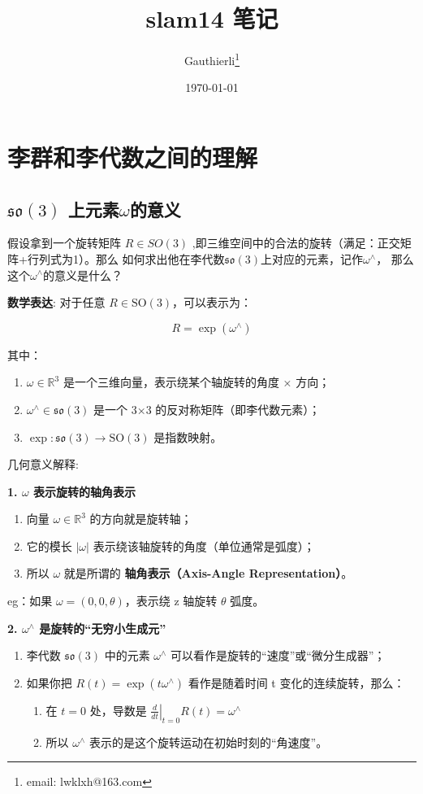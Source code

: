 \documentclass{article}
\title{\textbf{slam14 笔记}}
\author{Gauthierli\footnote{email: lwklxh@163.com}}
\date{\today}
\begin{document}
\maketitle
\newpage
\tableofcontents
\newpage

\section{李群和李代数之间的理解}
\subsection{$\mathfrak{so}(3)$ 上元素$\omega$的意义}
假设拿到一个旋转矩阵 $ R \in SO(3)$ ,即三维空间中的合法的旋转（满足：正交矩阵+行列式为1）。那么
如何求出他在李代数$\mathfrak{so}(3)$上对应的元素，记作$\omega ^{\wedge} $，
那么这个$\omega ^{\wedge} $的意义是什么？


\textbf{数学表达}:
对于任意 $ R \in \text{SO}(3) $，可以表示为：

$$
R = \exp(\omega^\wedge)
$$

其中：
\begin{enumerate}
  \item $ \omega \in \mathbb{R}^3 $ 是一个三维向量，表示绕某个轴旋转的角度 × 方向；
  \item $ \omega^\wedge \in \mathfrak{so}(3) $ 是一个 3×3 的反对称矩阵（即李代数元素）；
  \item $\exp: \mathfrak{so}(3) \to \text{SO}(3)$ 是指数映射。
\end{enumerate}


几何意义解释:

\textbf{1. $ \omega $ 表示旋转的轴角表示}
\begin{enumerate}
  \item 向量 $ \omega \in \mathbb{R}^3 $ 的方向就是旋转轴；
  \item 它的模长 $ |\omega| $ 表示绕该轴旋转的角度（单位通常是弧度）；
  \item 所以 $ \omega $ 就是所谓的 \textbf{轴角表示（Axis-Angle Representation）}。
\end{enumerate}

eg：如果 $ \omega = (0, 0, \theta) $，表示绕 z 轴旋转 $ \theta $ 弧度。

\textbf{2. $\omega^\wedge$ 是旋转的“无穷小生成元”}
\begin{enumerate}
\item 李代数 $ \mathfrak{so}(3) $ 中的元素 $ \omega^\wedge $ 可以看作是旋转的“速度”或“微分生成器”；
\item 如果你把 $ R(t) = \exp(t\omega^\wedge) $ 看作是随着时间 t 变化的连续旋转，那么：
  \begin{enumerate}
    \item 在 $ t=0 $ 处，导数是 $ \left.\frac{d}{dt}\right|_{t=0} R(t) = \omega^\wedge $
    \item 所以 $ \omega^\wedge $ 表示的是这个旋转运动在初始时刻的“角速度”。
  \end{enumerate}
\end{enumerate}
\end{document}
